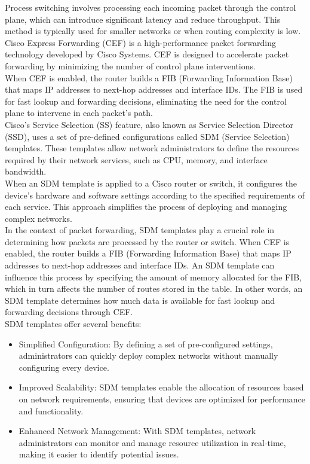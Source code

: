 \documentclass[parindent=0pt]{article}
\begin{document}
Process switching involves processing each incoming packet through the control plane, which can introduce significant latency and reduce throughput. This method is typically used for smaller networks or when routing complexity is low.\\

Cisco Express Forwarding (CEF) is a high-performance packet forwarding technology developed by Cisco Systems. CEF is designed to accelerate packet forwarding by minimizing the number of control plane interventions.\\

When CEF is enabled, the router builds a FIB (Forwarding Information Base) that maps IP addresses to next-hop addresses and interface IDs. The FIB is used for fast lookup and forwarding decisions, eliminating the need for the control plane to intervene in each packet's path.\\

Cisco's Service Selection (SS) feature, also known as Service Selection Director (SSD), uses a set of pre-defined configurations called SDM (Service Selection) templates. These templates allow network administrators to define the resources required by their network services, such as CPU, memory, and interface bandwidth.\\

When an SDM template is applied to a Cisco router or switch, it configures the device's hardware and software settings according to the specified requirements of each service. This approach simplifies the process of deploying and managing complex networks.\\

In the context of packet forwarding, SDM templates play a crucial role in determining how packets are processed by the router or switch. When CEF is enabled, the router builds a FIB (Forwarding Information Base) that maps IP addresses to next-hop addresses and interface IDs. An SDM template can influence this process by specifying the amount of memory allocated for the FIB, which in turn affects the number of routes stored in the table. In other words, an SDM template determines how much data is available for fast lookup and forwarding decisions through CEF.\\

SDM templates offer several benefits:
	\begin{itemize}
		\item Simplified Configuration: By defining a set of pre-configured settings, administrators can quickly deploy complex networks without manually configuring every device.
		\item Improved Scalability: SDM templates enable the allocation of resources based on network requirements, ensuring that devices are optimized for performance and functionality. 
		\item Enhanced Network Management: With SDM templates, network administrators can monitor and manage resource utilization in real-time, making it easier to identify potential issues. 
	\end{itemize}
\end{document}
